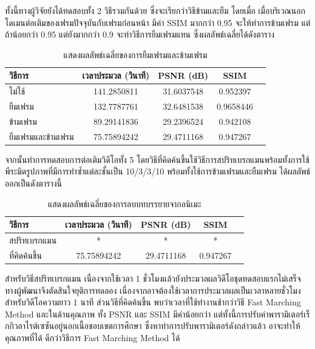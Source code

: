\documentclass[hidelinks, a4paper,12pt]{article}
\numberwithin{equation}{section}							%
\numberwithin{equation}{section}
\begin{document}
{	\hspace{1cm}ทั้งนี้ทางผู้วิจัยยังได้ทดสอบทั้ง 2 วิธีรวมกันด้วย ซึ่งจะเรียกว่าวิธีข้ามและยืม โดยเมื่อ เมื่อบริเวณนอกโดเมนต่อเติมของเฟรมปัจจุบันกับเฟรมก่อนหน้า มีค่า SSIM มากกว่า 0.95 จะให้ทำการข้ามเฟรม แต่ถ้าน้อยกว่า 0.95 แต่ยังมากกว่า 0.9 จะทำวิธีการยืมเฟรมแทน ซึ่งผลลัพธ์เฉลี่ยได้ดังตาราง
	
	\begin{table}[H]
		\centering
		\begin{tabular}[ht]{|l|c|c|c|c|}
			\hline
			วิธีการ  & เวลาประมวล  (วินาที) & PSNR (dB) & SSIM \\
			\hline
			ไม่ใช้ & 141.2850811 & 31.6037548 & 0.952397 \\
			ยืมเฟรม & 132.7787761 & 32.6481538 & 0.9658446 \\
			ข้ามเฟรม & 89.29141836 & 29.2396524 & 0.942108 \\
			ยืมเฟรมและข้ามเฟรม & 75.75894242 & 29.4711168 & 0.947267 \\
			\hline
		\end{tabular}
		\caption{แสดงผลลัพธ์เฉลี่ยของการยืมเฟรมและข้ามเฟรม}
	\end{table}	
	
	\hspace{1cm}  จากนั้นทำการทดสอบการต่อเติมวิดีโอทั้ง 5 โดยวิธีที่คิดค้นขึ้นใช้วิธีการสปริทเบรกแมนพร้อมทั้งการใช้พีระมิดรูปภาพที่มีการทำซ้ำแต่ละชั้นเป็น 10/3/3/10  พร้อมทั้งใช้การข้ามเฟรมและยืมเฟรม ได้ผลลัพธ์ออกเป็นดังตารางนี้
	 
\begin{table}[H]
	\centering
	\begin{tabular}[ht]{|l|c|c|c|c|}
		\hline
		วิธีการ  & เวลาประมวล  (วินาที) & PSNR (dB) & SSIM \\
		\hline
		สปริทเบรกแมน & * & * & * \\
		ที่คิดค้นขึ้น & 75.75894242 & 29.4711168 & 0.947267 \\
		\hline
	\end{tabular}
	\caption{แสดงผลลัพธ์เฉลี่ยของการลบบทบรรยายจากอนิเมะ}
\end{table}	

\hspace{1cm} สำหรับวิธีสปริทเบรกแมน เนื่องจากใช้เวลา 1 ชั่วโมงแล้วยังประมวลผลวิดีโอชุดทดสอบแรกไม่เสร็จ ทางผู้พัฒนาจึงตัดสินใจยุติการทดลอง เนื่องจากอาจต้องใช้เวลาการประมวลผลเป็นเวลาหลายชั่วโมงสำหรับวิดีโอความยาว 1 นาที ส่วนวิธีที่คิดค้นขึ้น พบว่าเวลาที่ใช้ทำงานช้ากว่าวิธี Fast Marching Method และในด้านคุณภาพ ทั้ง PSNR และ SSIM มีค่าน้อยกว่า แต่ทั้งนี้การปรับค่าพารามิเตอร์เร็กกิวลาไรต์เซซันอยู่นอกเนื้อขอบเขตการศึกษา ซึ่งหาทำการปรับพารามิเตอร์ดังกล่าวแล้ว อาจะทำให้คุณภาพที่ได้ ดีกว่าวิธีการ Fast Marching Method ได้

}
\end{document}
